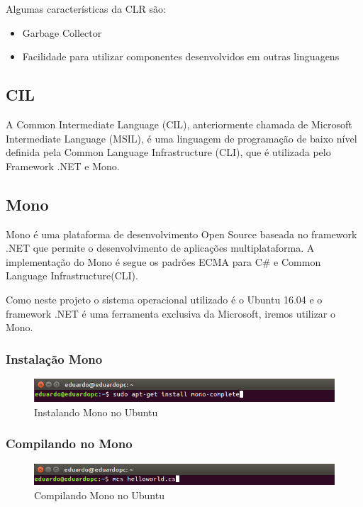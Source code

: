 \documentclass[hidelinks,12pt]{article}
\begin{document}
	\newpage
	Algumas características da CLR são:
	
	\begin{itemize}
	\item Garbage Collector
	\item Facilidade para utilizar componentes desenvolvidos em outras linguagens
	
	\end{itemize}
	
	\subsection{CIL}
	
	A Common Intermediate Language (CIL), anteriormente chamada de Microsoft Intermediate Language (MSIL), é uma linguagem de programação de baixo nível definida pela Common Language Infrastructure (CLI), que é utilizada pelo Framework .NET e Mono.

	\subsection{Mono}
	
	Mono é uma plataforma de desenvolvimento Open Source baseada no framework .NET que permite o desenvolvimento de aplicações multiplataforma. A implementação do Mono é segue os padrões ECMA para C\# e Common Language Infrastructure(CLI).
	
	Como neste projeto o sistema operacional utilizado é o Ubuntu 16.04 e o framework .NET é uma ferramenta exclusiva da Microsoft, iremos utilizar o Mono.
	
	\subsubsection{Instalação Mono}
	
	\begin{figure}[h!]
		\centering
		\includegraphics[scale=0.5]{Figures/Instalarmono}
		\caption{Instalando Mono no Ubuntu}
	\end{figure}
	
	\subsubsection{Compilando no Mono}
	
	\begin{figure}[h!]
	\centering
	\includegraphics[scale=0.5]{Figures/compilarmono}
	\caption{Compilando Mono no Ubuntu}
	\end{figure}
	
\end{document}
